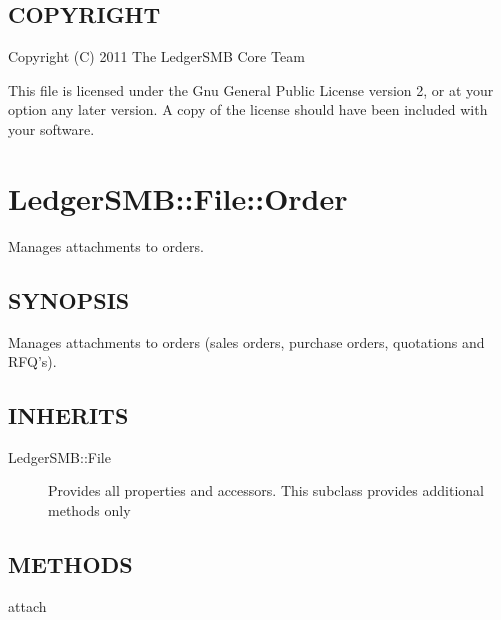 \begin{description}
\begin{description}
\begin{description}
\begin{description}
\begin{description}
\begin{description}
\end{description}
\subsection*{COPYRIGHT\label{LedgerSMB::File::Transaction_COPYRIGHT}}


Copyright (C) 2011 The LedgerSMB Core Team



This file is licensed under the Gnu General Public License version 2, or at your
option any later version.  A copy of the license should have been included with
your software.

\section{LedgerSMB::File::Order\label{LedgerSMB::File::Order}}


Manages attachments to orders.

\subsection*{SYNOPSIS\label{LedgerSMB::File::Order_SYNOPSIS}}


Manages attachments to orders (sales orders, purchase orders, quotations and
RFQ's).

\subsection*{INHERITS\label{LedgerSMB::File::Order_INHERITS}}
\begin{description}

\item[{LedgerSMB::File}] \mbox{}

Provides all properties and accessors.  This subclass provides additional 
methods only

\end{description}
\subsection*{METHODS\label{LedgerSMB::File::Order_METHODS}}
\begin{description}

\item[{attach}] \mbox{}


\end{description}
\end{description}
\end{description}
\end{description}
\end{description}
\end{description}
